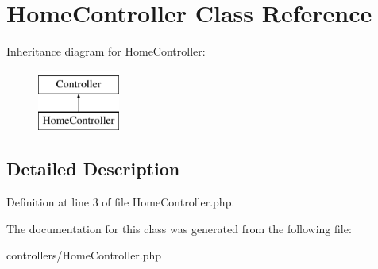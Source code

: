 \hypertarget{class_home_controller}{\section{\-Home\-Controller \-Class \-Reference}
\label{class_home_controller}
}
\-Inheritance diagram for \-Home\-Controller\-:\begin{figure}[H]
\begin{center}
\leavevmode
\includegraphics[height=2.000000cm]{class_home_controller}
\end{center}
\end{figure}


\subsection{\-Detailed \-Description}


\-Definition at line 3 of file \-Home\-Controller.\-php.



\-The documentation for this class was generated from the following file\-:\begin{DoxyCompactItemize}
\item 
controllers/\-Home\-Controller.\-php\end{DoxyCompactItemize}
